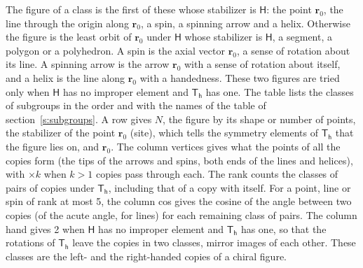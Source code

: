 \documentclass[10pt,a4paper]{article}
\numberwithin{equation}{section}
\newcommand{\grp}[1]{\mathsf{#1}}
\newcommand{\pointr}{\mathbf{r}}
\begin{document}
\leavevmode\label{n:head.figure}The figure of a class is the first of these whose stabilizer is $\grp{H}$: the point $\pointr_0$, the line through the origin along $\pointr_0$, a spin, a spinning arrow and a helix. Otherwise the figure is the least orbit of $\pointr_0$ under $\grp{H}$ whose stabilizer is $\grp{H}$, a segment, a polygon or a polyhedron. A spin is the axial vector $\pointr_0$, a sense of rotation about its line. A spinning arrow is the arrow $\pointr_0$ with a sense of rotation about itself, and a helix is the line along $\pointr_0$ with a handedness. These two figures are tried only when $\grp{H}$ has no improper element and $\grp{T_{h}}$ has one. The table lists the classes of subgroups in the order and with the names of the table of section~\ref{s:subgroups}. \label{n:head.site}A row gives $N$, the figure by its shape or number of points, the stabilizer of the point $\pointr_0$ (site), which tells the symmetry elements of $\grp{T_{h}}$ that the figure lies on, and $\pointr_0$. \label{n:head.vertices}The column vertices gives what the points of all the copies form (the tips of the arrows and spins, both ends of the lines and helices), with ${\times}k$ when $k > 1$ copies pass through each. \label{n:head.rank}The rank counts the classes of pairs of copies under $\grp{T_{h}}$, including that of a copy with itself. \label{n:head.cos}For a point, line or spin of rank at most 5, the column cos gives the cosine of the angle between two copies (of the acute angle, for lines) for each remaining class of pairs. \label{n:head.hand}The column hand gives 2 when $\grp{H}$ has no improper element and $\grp{T_{h}}$ has one, so that the rotations of $\grp{T_{h}}$ leave the copies in two classes, mirror images of each other. These classes are the left- and the right-handed copies of a chiral figure.
\end{document}
